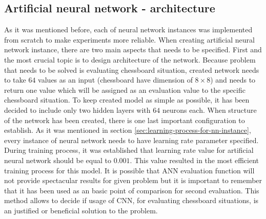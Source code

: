 \subsection{Artificial neural network - architecture}\label{sec:ann-architecture}
As it was mentioned before, each of neural network instances was implemented from scratch to make experiments more reliable. When creating artificial neural network instance, there are two main aspects that needs to be specified. First and the most crucial topic is to design architecture of the network. Because problem that needs to be solved is evaluating chessboard situation, created network needs to take $64$ values as an input (chessboard have dimension of $8 \times 8$) and needs to return one value which will be assigned as an evaluation value to the specific chessboard situation. To keep created model as simple as possible, it has been decided to include only two hidden layers with $64$ neurons each. When structure of the network has been created, there is one last important configuration to establish. As it was mentioned in section \ref{sec:learning-process-for-nn-instance}, every instance of neural network needs to have learning rate parameter specified. During training process, it was established that learning rate value for artificial neural network should be equal to $0.001$. This value resulted in the most efficient training process for this model. It is possible that ANN evaluation function will not provide spectacular results for given problem but it is important to remember that it has been used as an basic point of comparison for second evaluation. This method allows to decide if usage of CNN, for evaluating chessboard situations, is an justified or beneficial solution to the problem.

